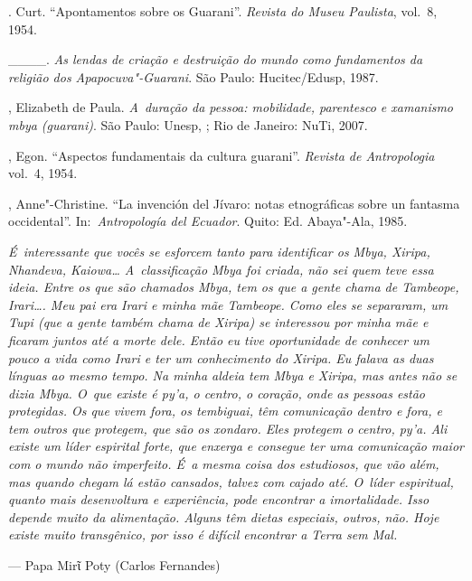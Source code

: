 \begin{Parskip}
. Curt. ``Apontamentos sobre os Guarani''. \emph{Revista do Museu
Paulista}, vol.~8, 1954.

\_\_\_\_. \emph{As lendas de criação e destruição do mundo como fundamentos da
religião dos Apapocuva"-Guarani}. São Paulo: Hucitec/Edusp, 1987.

, Elizabeth de Paula. \emph{A~duração da pessoa: mobilidade,
parentesco e xamanismo mbya (guarani)}. São Paulo: Unesp, ; Rio de
Janeiro: NuTi, 2007.

, Egon. ``Aspectos fundamentais da cultura guarani''. \emph{Revista de
Antropologia} vol.~4, 1954.

, Anne"-Christine. ``La invención del Jívaro: notas etnográficas
sobre un fantasma occidental''. In:~\emph{Antropología del Ecuador}. Quito: Ed.
Abaya"-Ala, 1985.
\end{Parskip}

\clearpage

\vspace*{\fill}

\begin{flushright}
\begin{minipage}[c]{0.85\textwidth}
\raggedleft
\footnotesize
\emph{É~interessante que vocês se esforcem tanto para identificar os Mbya,
Xiripa, Nhandeva, Kaiowa\ldots{} A~classificação Mbya foi criada, não sei
quem teve essa ideia. Entre os que são chamados Mbya, tem os que a
gente chama de \emph{Tambeope, Irari\ldots{}}. Meu pai era Irari e
minha mãe Tambeope. Como eles se separaram, um Tupi (que a gente também
chama de Xiripa) se interessou por minha mãe e ficaram juntos até a
morte dele. Então eu tive oportunidade de conhecer um pouco a vida como
Irari e ter um conhecimento do Xiripa. Eu falava as duas línguas ao
mesmo tempo. Na minha aldeia tem Mbya e Xiripa, mas antes não se dizia
Mbya. O~que existe é \emph{py’a}, o centro, o coração, onde as pessoas estão
protegidas. Os que vivem fora, os \emph{tembiguai}, têm comunicação dentro e
fora, e tem outros que protegem, que são os \emph{xondaro}. Eles protegem o
centro, \emph{py’a}. Ali existe um líder espirital forte, que enxerga e
consegue ter uma comunicação maior com o mundo não imperfeito. É~a
mesma coisa dos estudiosos, que vão além, mas quando chegam lá
estão cansados, talvez com cajado até. O~líder espiritual, quanto mais
desenvoltura e experiência, pode encontrar a imortalidade. Isso depende
muito da alimentação. Alguns têm dietas especiais, outros, não. Hoje
existe muito transgênico, por isso é difícil encontrar a Terra sem Mal.}

\smallskip
\hspace*{\fill}--- Papa Mirῖ Poty (Carlos Fernandes)
\end{minipage}
\end{flushright}


